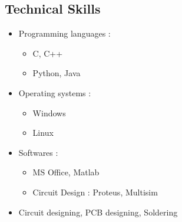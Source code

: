 \documentclass[margin,line]{res}
\begin{document}
\begin{resume}
\section{\sc Technical Skills}
\begin{itemize}
	\item Programming languages : 
	\begin{itemize}
		\item C, C++
		\item Python, Java
	\end{itemize}
	\item Operating systems : 
	\begin{itemize}
		\item Windows
		\item Linux
	\end{itemize}
	\item Softwares :
	\begin{itemize}
		 \item MS Office, Matlab
		\item Circuit Design : Proteus, Multisim
	\end{itemize}
	\item Circuit designing, PCB designing, Soldering
\end{itemize}
\end{resume}
\end{document}

